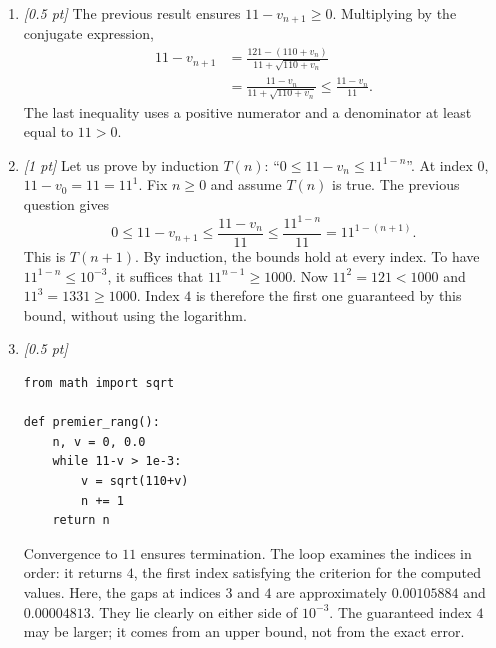 \begin{enumerate}
\item \textit{[0.5 pt]} The previous result ensures $11-v_{n+1}\ge0$. Multiplying by the conjugate expression,
\[\begin{aligned}11-v_{n+1}&=\frac{121-(110+v_n)}{11+\sqrt{110+v_n}}\\&=\frac{11-v_n}{11+\sqrt{110+v_n}}\le\frac{11-v_n}{11}.\end{aligned}\]
The last inequality uses a positive numerator and a denominator at least equal to $11>0$.

\item \textit{[1 pt]} Let us prove by induction $T(n)$: ``$0\le 11-v_n\le 11^{1-n}$''.
At index $0$, $11-v_0=11=11^1$. Fix $n\ge0$ and assume $T(n)$ is true. The previous question gives
\[0\le 11-v_{n+1}\le\frac{11-v_n}{11}\le\frac{11^{1-n}}{11}=11^{1-(n+1)}.\]
This is $T(n+1)$. By induction, the bounds hold at every index.
To have $11^{1-n}\le10^{-3}$, it suffices that $11^{n-1}\ge1000$.
Now $11^{2}=121<1000$ and $11^{3}=1331\ge1000$. Index $4$ is therefore the first one guaranteed by this bound, without using the logarithm.


\item \textit{[0.5 pt]} 
\begin{lstlisting}
from math import sqrt

def premier_rang():
    n, v = 0, 0.0
    while 11-v > 1e-3:
        v = sqrt(110+v)
        n += 1
    return n
\end{lstlisting}
Convergence to $11$ ensures termination. The loop examines the indices in order: it returns $4$, the first index satisfying the criterion for the computed values. Here, the gaps at indices $3$ and $4$ are approximately $0.00105884$ and $0.00004813$. They lie clearly on either side of $10^{-3}$. The guaranteed index $4$ may be larger; it comes from an upper bound, not from the exact error.

\end{enumerate}

